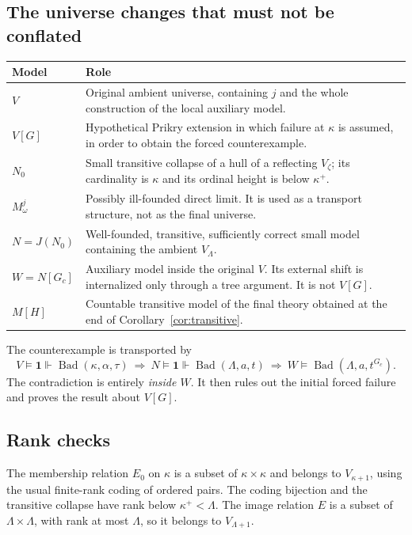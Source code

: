 \documentclass[11pt,letterpaper]{article}
\theoremstyle{definition}
\newcommand{\Bad}{\operatorname{Bad}}
\newcommand{\forces}{\Vdash}
\begin{document}
\subsection{The universe changes that must not be conflated}

\begin{center}
\small
\renewcommand{\arraystretch}{1.18}
\begin{tabularx}{\textwidth}{@{}lY@{}}
\toprule
\textbf{Model}&\textbf{Role}\\\midrule
$V$&Original ambient universe, containing $j$ and the whole construction of the local auxiliary model.\\
$V[G]$&Hypothetical Prikry extension in which failure at $\kappa$ is assumed, in order to obtain the forced counterexample.\\
$N_0$&Small transitive collapse of a hull of a reflecting $V_\zeta$; its cardinality is $\kappa$ and its ordinal height is below $\kappa^+$.\\
$M^j_\omega$&Possibly ill-founded direct limit. It is used as a transport structure, not as the final universe.\\
$N=J(N_0)$&Well-founded, transitive, sufficiently correct small model containing the ambient $V_\Lambda$.\\
$W=N[G_c]$&Auxiliary model inside the original $V$. Its external shift is internalized only through a tree argument. It is not $V[G]$.\\
$M[H]$&Countable transitive model of the final theory obtained at the end of Corollary~\ref{cor:transitive}.\\
\bottomrule
\end{tabularx}
\end{center}

The counterexample is transported by
\[
 V\models\mathbf1\forces\Bad(\kappa,\alpha,\tau)
 \ \Longrightarrow\
 N\models\mathbf1\forces\Bad(\Lambda,a,t)
 \ \Longrightarrow\
 W\models\Bad(\Lambda,a,t^{G_c}).
\]
The contradiction is entirely \emph{inside $W$}. It then rules out the
initial forced failure and proves the result about $V[G]$.

\subsection{Rank checks}

The membership relation $E_0$ on $\kappa$ is a subset of
$\kappa\times\kappa$ and belongs to $V_{\kappa+1}$, using the usual
finite-rank coding of ordered pairs. The coding bijection and the
transitive collapse have rank below $\kappa^+<\Lambda$.
The image relation $E$ is a subset of $\Lambda\times\Lambda$, with
rank at most $\Lambda$, so it belongs to $V_{\Lambda+1}$.
\end{document}
